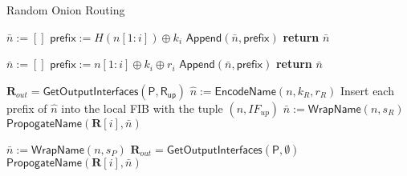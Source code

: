 \documentclass{llncs}
\begin{document}
\begin{algorithm}[t]
  \caption{Random Onion Routing}
  \begin{algorithmic}[1]

    \State $\bar{n} := []$
    	\State $\mathsf{prefix} := H(n[1:i]) \oplus k_i$
    	\State $\mathsf{Append}(\bar{n}, \mathsf{prefix})$
    \EndFor
    \State \textbf{return} $\bar{n}$
\EndFunction

    \State $\bar{n} := []$
    	\State $\mathsf{prefix} := n[1:i] \oplus k_i \oplus r_i$
    	\State $\mathsf{Append}(\bar{n}, \mathsf{prefix})$
    \EndFor
    \State \textbf{return} $\bar{n}$
\EndFunction

	\State $\mathbf{R}_{out} = \mathsf{GetOutputInterfaces(P, R_{up})}$ %
	\State $\hat{n} := \mathsf{EncodeName}(n, k_R, r_R)$
	\State Insert each prefix of $\hat{n}$ into the local FIB with the tuple $(n, IF_{up})$
	\State $\bar{n} := \mathsf{WrapName}(n, s_R)$
      \State $\mathsf{PropogateName}(\mathbf{R}[i], \bar{n})$
    \EndFor
\EndFunction

    \State $\bar{n} := \mathsf{WrapName}(n, s_P)$
    \State $\mathbf{R}_{out} = \mathsf{GetOutputInterfaces(P, \emptyset)}$
    	\State $\mathsf{PropogateName}(\mathbf{R}[i], \bar{n})$
    \EndFor
\EndFunction

\end{algorithmic}
\end{algorithm}
\end{document}
